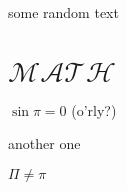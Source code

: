 \documentclass{trlnotes}
\begin{document}
some random text

\blinddocument

\section{$\mathcal{M\!AT\!H}$}
\makeatletter


\makeatother
\def\proofname{$\square$}
\def\qedsymbol{$\blacksquare$}
\begin{tproof}[kek?]
  $\sin\pi=0$ (o'rly?)
  \begin{lproof}[nested]
    another one
    \begin{sproof}
      $\Pi\neq\pi$
    \end{sproof}
  \end{lproof}
\end{tproof}
\end{document}

